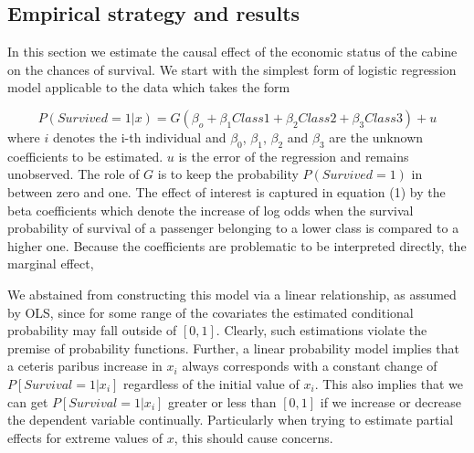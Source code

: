 \documentclass[
]{article}
\begin{document}
\hypertarget{empirical-strategy-and-results}{%
\subsection{Empirical strategy and
results}\label{empirical-strategy-and-results}}

In this section we estimate the causal effect of the economic status of
the cabine on the chances of survival. We start with the simplest form
of logistic regression model applicable to the data which takes the form

\[P(Survived = 1|x)= G(\beta_o + \beta_1Class1 + \beta_2Class2 + \beta_3Class3) + u\]
where \(i\) denotes the i-th individual and \(\beta_0\), \(\beta_1\),
\(\beta_2\) and \(\beta_3\) are the unknown coefficients to be
estimated. \(u\) is the error of the regression and remains unobserved.
The role of \(G\) is to keep the probability \(P(Survived = 1)\) in
between zero and one. The effect of interest is captured in equation (1)
by the beta coefficients which denote the increase of log odds when the
survival probability of survival of a passenger belonging to a lower
class is compared to a higher one. Because the coefficients are
problematic to be interpreted directly, the marginal effect,

We abstained from constructing this model via a linear relationship, as
assumed by OLS, since for some range of the covariates the estimated
conditional probability may fall outside of \([0,1]\). Clearly, such
estimations violate the premise of probability functions. Further, a
linear probability model implies that a ceteris paribus increase in
\(x_i\) always corresponds with a constant change of
\(P[Survival=1|x_i]\) regardless of the initial value of \(x_i\). This
also implies that we can get \(P[Survival=1|x_i]\) greater or less than
\([0,1]\) if we increase or decrease the dependent variable continually.
Particularly when trying to estimate partial effects for extreme values
of \(x\), this should cause concerns.
\end{document}
